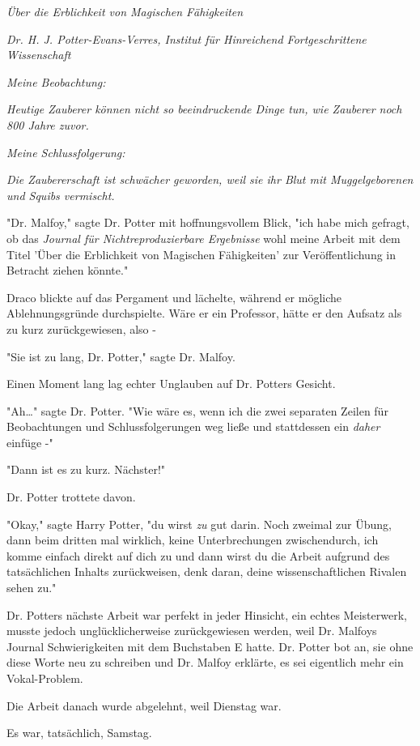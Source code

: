 {\emph{Über die Erblichkeit von Magischen Fähigkeiten}

\emph{Dr. H. J. Potter-Evans-Verres, Institut für Hinreichend Fortgeschrittene Wissenschaft}

\emph{Meine Beobachtung:}

\emph{Heutige Zauberer können nicht so beeindruckende Dinge tun, wie Zauberer noch 800 Jahre zuvor.}

\emph{Meine Schlussfolgerung:}

\emph{Die Zaubererschaft ist schwächer geworden, weil sie ihr Blut mit Muggelgeborenen und Squibs vermischt.}

"Dr. Malfoy," sagte Dr. Potter mit hoffnungsvollem Blick, "ich habe mich gefragt, ob das \emph{Journal für Nichtreproduzierbare Ergebnisse} wohl meine Arbeit mit dem Titel 'Über die Erblichkeit von Magischen Fähigkeiten' zur Veröffentlichung in Betracht ziehen könnte."

Draco blickte auf das Pergament und lächelte, während er mögliche Ablehnungsgründe durchspielte. Wäre er ein Professor, hätte er den Aufsatz als zu kurz zurückgewiesen, also -

"Sie ist zu lang, Dr. Potter," sagte Dr. Malfoy.

Einen Moment lang lag echter Unglauben auf Dr. Potters Gesicht.

"Ah…" sagte Dr. Potter. "Wie wäre es, wenn ich die zwei separaten Zeilen für Beobachtungen und Schlussfolgerungen weg ließe und stattdessen ein \emph{daher} einfüge -"

"Dann ist es zu kurz. Nächster!"

Dr. Potter trottete davon.

"Okay," sagte Harry Potter, "du wirst \emph{zu} gut darin. Noch zweimal zur Übung, dann beim dritten mal wirklich, keine Unterbrechungen zwischendurch, ich komme einfach direkt auf dich zu und dann wirst du die Arbeit aufgrund des tatsächlichen Inhalts zurückweisen, denk daran, deine wissenschaftlichen Rivalen sehen zu."

Dr. Potters nächste Arbeit war perfekt in jeder Hinsicht, ein echtes Meisterwerk, musste jedoch unglücklicherweise zurückgewiesen werden, weil Dr. Malfoys Journal Schwierigkeiten mit dem Buchstaben E hatte. Dr. Potter bot an, sie ohne diese Worte neu zu schreiben und Dr. Malfoy erklärte, es sei eigentlich mehr ein Vokal-Problem.

Die Arbeit danach wurde abgelehnt, weil Dienstag war.

Es war, tatsächlich, Samstag.

}

